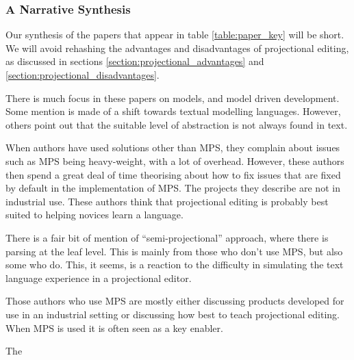 \subsubsection{A Narrative Synthesis}
Our synthesis of the papers that appear in table \ref{table:paper_key} will be short.
We will avoid rehashing the advantages and disadvantages of projectional editing, as discussed in sections \ref{section:projectional_advantages} and \ref{section:projectional_disadvantages}.

There is much focus in these papers on models, and model driven development.
Some mention is made of a shift towards textual modelling languages.
However, others point out that the suitable level of abstraction is not always found in text.

When authors have used solutions other than MPS, they complain about issues such as MPS being heavy-weight, with a lot of overhead.
However, these authors then spend a great deal of time theorising about how to fix issues that are fixed by default in the implementation of MPS.
The projects they describe are not in industrial use.
These authors think that projectional editing is probably best suited to helping novices learn a language. 

There is a fair bit of mention of ``semi-projectional'' approach, where there is parsing at the leaf level.
This is mainly from those who don't use MPS, but also some who do.
This, it seems, is a reaction to the difficulty in simulating the text language experience in a projectional editor.

Those authors who use MPS are mostly either discussing products developed for use in an industrial setting or discussing how best to teach projectional editing.
When MPS is used it is often seen as a key enabler.

The
